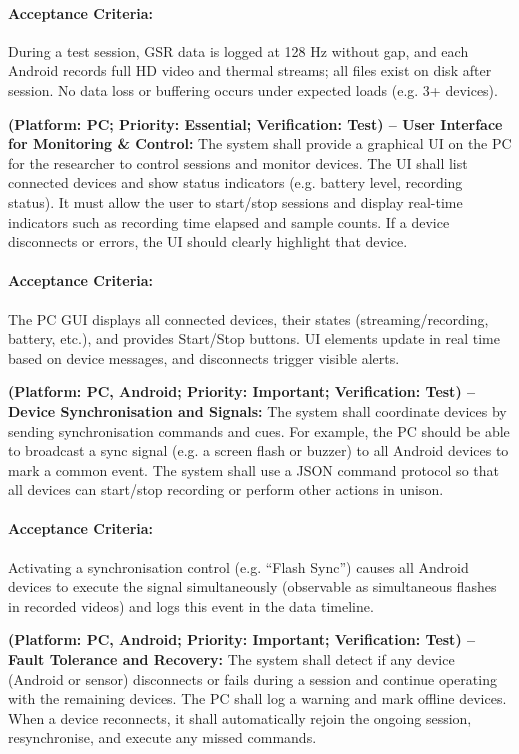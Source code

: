 \begin{description}[style=unboxed,leftmargin=0cm]
    \paragraph{Acceptance Criteria:} During a test session, GSR data is logged at 128 Hz without gap, and each Android records full HD video and thermal streams; all files exist on disk after session. No data loss or buffering occurs under expected loads (e.g. 3+ devices).

    \item[\textbf{FR6}] \textbf{(Platform: PC; Priority: Essential; Verification: Test) – User Interface for Monitoring \& Control:} The system shall provide a graphical UI on the PC for the researcher to control sessions and monitor devices. The UI shall list connected devices and show status indicators (e.g. battery level, recording status). It must allow the user to start/stop sessions and display real-time indicators such as recording time elapsed and sample counts. If a device disconnects or errors, the UI should clearly highlight that device.

    \paragraph{Acceptance Criteria:} The PC GUI displays all connected devices, their states (streaming/recording, battery, etc.), and provides Start/Stop buttons. UI elements update in real time based on device messages, and disconnects trigger visible alerts.

    \item[\textbf{FR7}] \textbf{(Platform: PC, Android; Priority: Important; Verification: Test) – Device Synchronisation and Signals:} The system shall coordinate devices by sending synchronisation commands and cues. For example, the PC should be able to broadcast a sync signal (e.g. a screen flash or buzzer) to all Android devices to mark a common event. The system shall use a JSON command protocol so that all devices can start/stop recording or perform other actions in unison.

    \paragraph{Acceptance Criteria:} Activating a synchronisation control (e.g. “Flash Sync”) causes all Android devices to execute the signal simultaneously (observable as simultaneous flashes in recorded videos) and logs this event in the data timeline.

    \item[\textbf{FR8}] \textbf{(Platform: PC, Android; Priority: Important; Verification: Test) – Fault Tolerance and Recovery:} The system shall detect if any device (Android or sensor) disconnects or fails during a session and continue operating with the remaining devices. The PC shall log a warning and mark offline devices. When a device reconnects, it shall automatically rejoin the ongoing session, resynchronise, and execute any missed commands.


\end{description}
